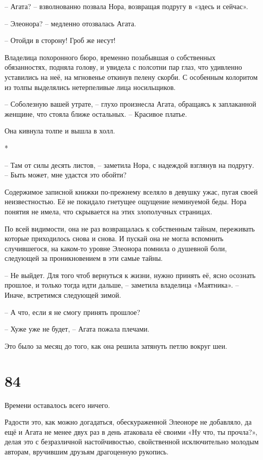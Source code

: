 \documentclass[
  a5paperpaper,
  DIV=11,
  numbers=noendperiod]{scrreprt}
\begin{document}
-- Агата? -- взволнованно позвала Нора, возвращая подругу в «здесь и
сейчас».

-- Элеонора? -- медленно отозвалась Агата.

-- Отойди в сторону! Гроб же несут!

Владелица похоронного бюро, временно позабывшая о собственных
обязанностях, подняла голову, и увидела с полсотни пар глаз, что
удивленно уставились на неё, на мгновенье откинув пелену скорби. С
особенным колоритом из толпы выделялись нетерпеливые лица носильщиков.

-- Соболезную вашей утрате, -- глухо произнесла Агата, обращаясь к
заплаканной женщине, что стояла ближе остальных. -- Красивое платье.

Она кивнула толпе и вышла в холл.

*

-- Там от силы десять листов, -- заметила Нора, с надеждой взглянув на
подругу. -- Быть может, мне удастся это обойти?

Содержимое записной книжки по-прежнему вселяло в девушку ужас, пугая
своей неизвестностью. Её не покидало гнетущее ощущение неминуемой беды.
Нора понятия не имела, что скрывается на этих злополучных страницах.

По всей видимости, она не раз возвращалась к собственным тайнам,
переживать которые приходилось снова и снова. И пускай она не могла
вспомнить случившегося, на каком-то уровне Элеонора помнила о душевной
боли, следующей за проникновением в эти самые тайны.

-- Не выйдет. Для того чтоб вернуться к жизни, нужно принять её, ясно
осознать прошлое, и только тогда идти дальше, -- заметила владелица
«Маятника». -- Иначе, встретимся следующей зимой.

-- А что, если я не смогу принять прошлое?

-- Хуже уже не будет, -- Агата пожала плечами.

Это было за месяц до того, как она решила затянуть петлю вокруг шеи.

\section*{84}\label{84}


Времени оставалось всего ничего.

Радости это, как можно догадаться, обескураженной Элеоноре не добавляло,
да ещё и Агата не менее двух раз в день атаковала её своими «Ну что, ты
прочла?», делая это с безразличной настойчивостью, свойственной
исключительно молодым авторам, вручившим друзьям драгоценную рукопись.
\end{document}
